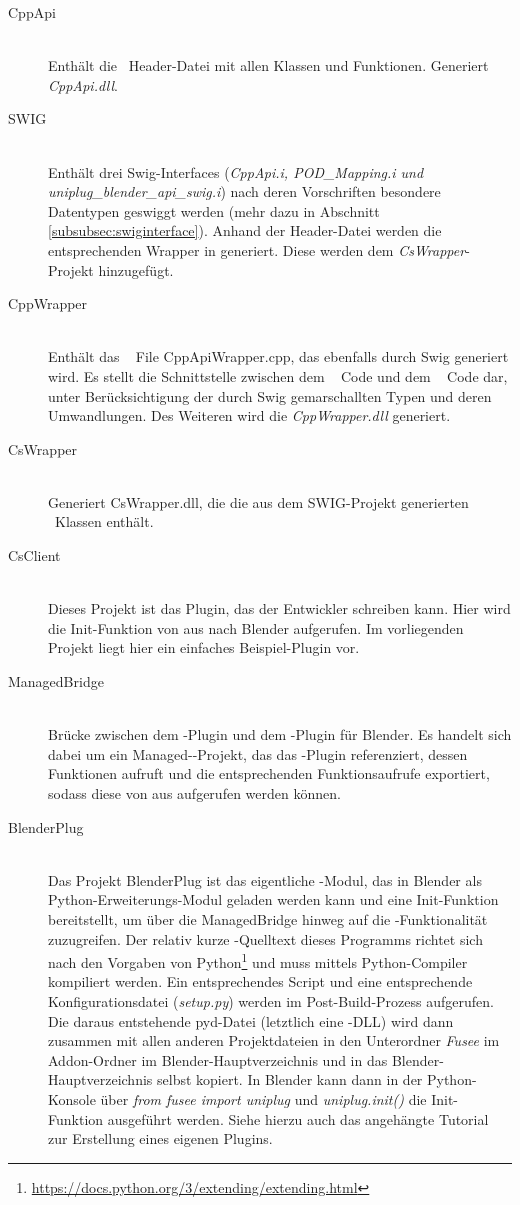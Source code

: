 \begin{description}
\item[CppApi]\hfill \\
Enthält die \CC~Header-Datei mit allen Klassen und Funktionen. Generiert \emph{CppApi.dll}.
\item[SWIG]\hfill \\
Enthält drei Swig-Interfaces (\emph{CppApi.i, POD\_Mapping.i und \\
uniplug\_blender\_api\_swig.i}) nach deren Vorschriften besondere Datentypen geswiggt werden (mehr dazu in Abschnitt \ref{subsubsec:swiginterface}). Anhand der Header-Datei werden die entsprechenden Wrapper in \CS generiert. Diese werden dem \emph{CsWrapper}-Projekt hinzugefügt.
\item[CppWrapper]\hfill \\
Enthält das \CC~ File CppApiWrapper.cpp, das ebenfalls durch Swig generiert wird. Es stellt die Schnittstelle zwischen dem \CC~ Code und dem \CS~ Code dar, unter Berücksichtigung der durch Swig gemarschallten Typen und deren Umwandlungen. Des Weiteren wird die \emph{CppWrapper.dll} generiert.
\item[CsWrapper]\hfill \\
Generiert CsWrapper.dll, die die aus dem SWIG-Projekt generierten \CS~Klassen enthält. 
\item[CsClient]\hfill \\
Dieses Projekt ist das Plugin, das der Entwickler schreiben kann. Hier wird die Init-Funktion von \CS aus nach Blender aufgerufen. Im vorliegenden Projekt liegt hier ein einfaches Beispiel-Plugin vor.
\item[ManagedBridge]\hfill \\ 
Brücke zwischen dem \CS-Plugin und dem \CC-Plugin für Blender. Es handelt sich dabei um ein Managed-\CC-Projekt, das das \CS-Plugin referenziert, dessen Funktionen aufruft und die entsprechenden Funktionsaufrufe exportiert, sodass diese von \CC aus aufgerufen werden können.
\item[BlenderPlug]\hfill \\ 
Das Projekt BlenderPlug ist das eigentliche \CC-Modul, das in Blender als Python-Erweiterungs-Modul geladen werden kann und eine Init-Funktion bereitstellt, um über die ManagedBridge hinweg auf die \CS{}-Funktionalität zuzugreifen. Der relativ kurze \CC-Quelltext dieses Programms richtet sich nach den Vorgaben von Python\footnote{\url{https://docs.python.org/3/extending/extending.html}} und muss mittels Python-Compiler kompiliert werden. Ein entsprechendes Script und eine entsprechende Konfigurationsdatei (\emph{setup.py}) werden im Post-Build-Prozess aufgerufen. Die daraus entstehende pyd-Datei (letztlich eine \CC-DLL) wird dann zusammen mit allen anderen Projektdateien in den Unterordner \emph{Fusee} im Addon-Ordner im Blender-Hauptverzeichnis und in das Blender-Hauptverzeichnis selbst kopiert. In Blender kann dann in der Python-Konsole über \emph{from fusee import uniplug} und \emph{uniplug.init()} die Init-Funktion ausgeführt werden. Siehe hierzu auch das angehängte Tutorial zur Erstellung eines eigenen Plugins.
\end{description}

